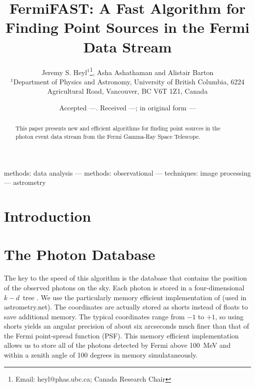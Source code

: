 \documentclass[useAMS,usenatbib]{mn2e}
\title[FermiFAST]{FermiFAST: A Fast Algorithm for Finding Point Sources
in the Fermi Data Stream}
\author[J. S. Heyl, A. Ashathaman and A. Barton]{Jeremy S. Heyl$^{1}$\thanks{Email:
    heyl@phas.ubc.ca; Canada Research Chair}, Asha Ashathaman and Alistair Barton\\
$^{1}$Department of Physics and Astronomy, University of British
Columbia, 6224 Agricultural Road, Vancouver, BC V6T 1Z1, Canada}
\begin{document}
\date{Accepted ---. Received ---; in original form ---}

\pagerange{\pageref{firstpage}--\pageref{lastpage}} 

\maketitle

\label{firstpage}

\begin{abstract}
  This paper presents new and efficient algorithms for finding point
  sources in the photon event data stream from the 
  Fermi Gamma-Ray Space Telescope.
\end{abstract}

\begin{keywords}
methods: data analysis --- methods: observational --- techniques:
image processing --- astrometry
\end{keywords}

\section{Introduction}

\section{The Photon Database}

The key to the speed of this algorithm is the database that contains
the position of the observed photons on the sky.  Each photon is
stored in a four-dimensional $k-d$~tree
\citep{Bentley:1975:MBS:361002.361007}.  We use the particularly
memory efficient implementation of \citet{LangPhD} (used in
astrometry.net).  The coordinates are actually stored as shorts
instead of floats to save additional memory.  The typical coordinates
range from $-1$ to $+1$, so using shorts yields an angular precision
of about six arcseconds much finer than that of the Fermi point-spread
function (PSF).  This memory efficient implementation allows us to
store all of the photons detected by Fermi above 100~MeV and within a
zenith angle of 100 degrees in memory simulataneously.
\end{document}
